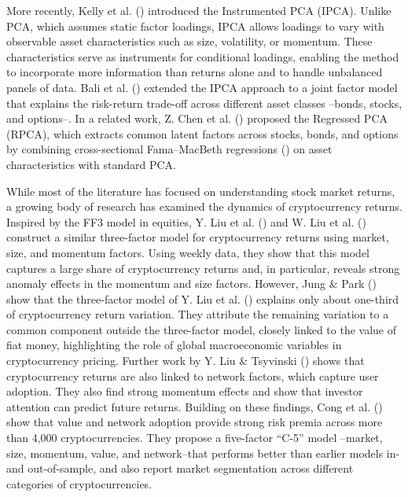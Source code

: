 \documentclass[
  12pt,
  a4paper,
  openany]{scrbook}
\begin{document}
More recently, Kelly et al.
() introduced the
Instrumented PCA (IPCA). Unlike PCA, which assumes static factor
loadings, IPCA allows loadings to vary with observable asset
characteristics such as size, volatility, or momentum. These
characteristics serve as instruments for conditional loadings, enabling
the method to incorporate more information than returns alone and to
handle unbalanced panels of data. Bali et al.
() extended the IPCA approach to
a joint factor model that explains the risk-return trade-off across
different asset classes --bonds, stocks, and options--. In a related
work, Z. Chen et al. () proposed
the Regressed PCA (RPCA), which extracts common latent factors across
stocks, bonds, and options by combining cross-sectional Fama--MacBeth
regressions ()
on asset characteristics with standard PCA.

While most of the literature has focused on understanding stock market
returns, a growing body of research has examined the dynamics of
cryptocurrency returns. Inspired by the FF3 model in equities, Y. Liu et
al. () and W. Liu et al.
() construct a similar
three-factor model for cryptocurrency returns using market, size, and
momentum factors. Using weekly data, they show that this model captures
a large share of cryptocurrency returns and, in particular, reveals
strong anomaly effects in the momentum and size factors. However, Jung
\& Park () show that the
three-factor model of Y. Liu et al.
() explains only about one-third
of cryptocurrency return variation. They attribute the remaining
variation to a common component outside the three-factor model, closely
linked to the value of fiat money, highlighting the role of global
macroeconomic variables in cryptocurrency pricing. Further work by Y.
Liu \& Tsyvinski () shows that
cryptocurrency returns are also linked to network factors, which capture
user adoption. They also find strong momentum effects and show that
investor attention can predict future returns. Building on these
findings, Cong et al. () show
that value and network adoption provide strong risk premia across more
than 4,000 cryptocurrencies. They propose a five-factor ``C-5'' model
--market, size, momentum, value, and network--that performs better than
earlier models in- and out-of-sample, and also report market
segmentation across different categories of cryptocurrencies.
\end{document}
